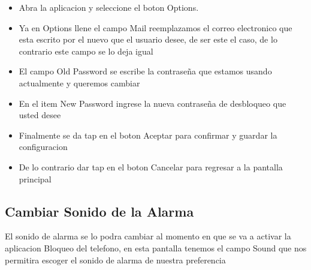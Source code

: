 \documentclass[12pt,letterpaper]{article}
\begin{document}
 \begin{itemize}

\item{Abra la aplicacion y seleccione el boton Options.}
\item{Ya en Options llene el campo Mail reemplazamos el correo electronico que esta escrito por el nuevo que el usuario desee, de ser este el caso, de lo contrario este campo se lo deja igual }
\item{El campo Old Password se escribe la contraseña que estamos usando actualmente y queremos cambiar}
\item{En el item New Password ingrese la nueva contraseña de desbloqueo que usted desee}
\item{Finalmente se da tap en el boton Aceptar para confirmar y guardar la configuracion}
\item{De lo contrario dar tap en el boton Cancelar para regresar a la pantalla principal}


\end{itemize}


\subsection{Cambiar Sonido de la Alarma}
El sonido de alarma se lo podra cambiar al momento en que se va a activar la aplicacion Bloqueo del telefono, en esta pantalla tenemos el campo Sound que nos permitira escoger el sonido de alarma de nuestra preferencia
\end{document}
